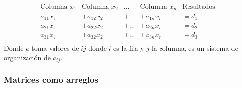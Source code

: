 $$\begin{array}{cccc|c}
\text{Columna } x_1 & \text{Columna } x_2 & \dots & \text{Columna } x_n & \text{Resultados} \\ \hline
a_{11}x_1 & + a_{12}x_2 & + \dots & + a_{1n}x_n & = d_1 \\
a_{21}x_1 & + a_{22}x_2 & + \dots & + a_{2n}x_n & = d_2 \\
a_{31}x_1 & + a_{32}x_2 & + \dots & + a_{3n}x_n & = d_3 \\
\end{array}$$
Donde \(a\) toma valores de \(ij\) donde \(i\) es la fila y \(j\) la columna, es un sistema de organización de \(a_{ij}\).



\subsubsection{Matrices como arreglos}

